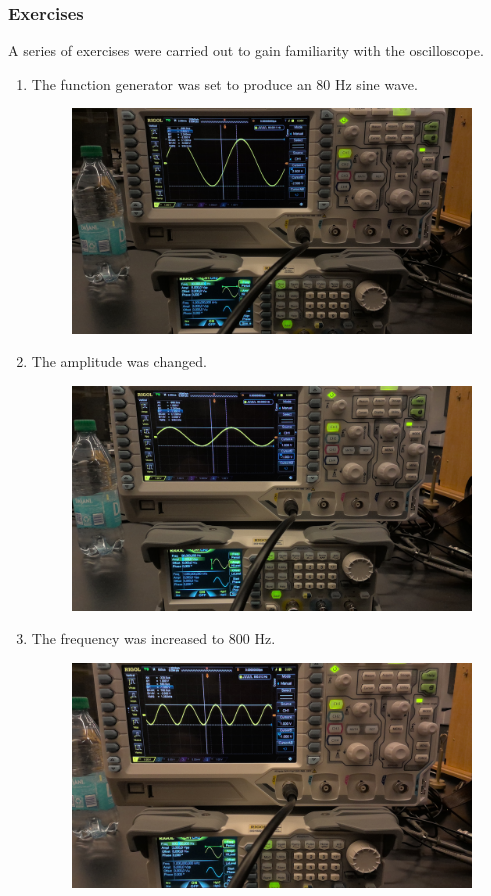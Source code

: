 \documentclass{article}
\begin{document}
        \subsubsection{Exercises}
            A series of exercises were carried out to gain familiarity with the oscilloscope.

            \begin{enumerate}[label=(\alph*)]
                \item The function generator was set to produce an 80 Hz sine wave.
                \begin{figure}[h]
                    \centering
                    \includegraphics[width=0.2\linewidth]{a.jpg}
                \end{figure}

                \item The amplitude was changed.
                \begin{figure}[h]
                    \centering
                    \includegraphics[width=0.2\linewidth]{b.jpg}
                \end{figure}
                
                \item The frequency was increased to 800 Hz.
                \begin{figure}[h]
                    \centering
                    \includegraphics[width=0.2\linewidth]{c.jpg}
                \end{figure}
                

\end{enumerate}
\end{document}
